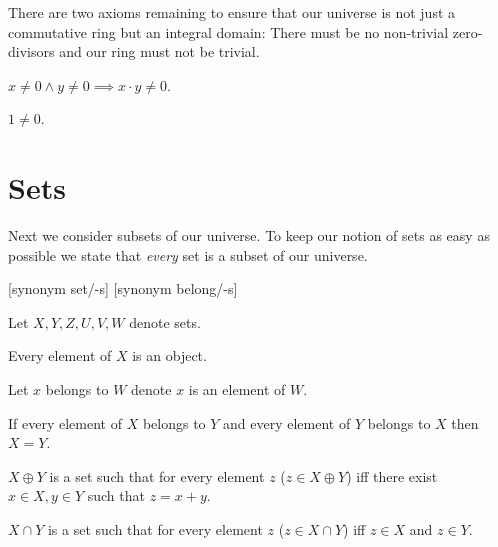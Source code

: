 \documentclass{article}
\begin{document}
  There are two axioms remaining to ensure that our universe is not just a commutative ring but an integral domain: There must be no non-trivial zero-divisors and our ring must not be trivial.

  \begin{forthel}
    \begin{axiom}[Cancel]
      $x \neq 0 \wedge y \neq 0 \implies x \cdot y \neq 0$.
    \end{axiom}

    \begin{axiom}[UnNeZr]
      $1 \neq 0$.
    \end{axiom}
  \end{forthel}


  \section{Sets}

  Next we consider subsets of our universe. To keep our notion of sets as easy as possible we state that \textit{every} set is a subset of our universe.

  \begin{forthel}

    [synonym set/-s] [synonym belong/-s]

    Let $X,Y,Z,U,V,W$ denote sets.

    \begin{axiom}
      Every element of $X$ is an object.
    \end{axiom}

    Let $x$ belongs to $W$ denote $x$ is an element of $W$.

    \begin{axiom}[SetEq]
      If every element of $X$ belongs to $Y$ and every element of $Y$ belongs to $X$ then $X = Y$.
    \end{axiom}

    \begin{definition}[DefSum]
      $X \oplus Y$ is a set such that for every element $z$ ($z \in X \oplus Y$) iff there exist $x \in X, y \in Y$ such that $z = x + y$.
    \end{definition}

    \begin{definition}[DefSInt]
      $X \cap Y$ is a set such that for every element $z$ ($z \in X \cap Y$) iff $z \in X$ and $z \in Y$.
    \end{definition}
  \end{forthel}
\end{document}
